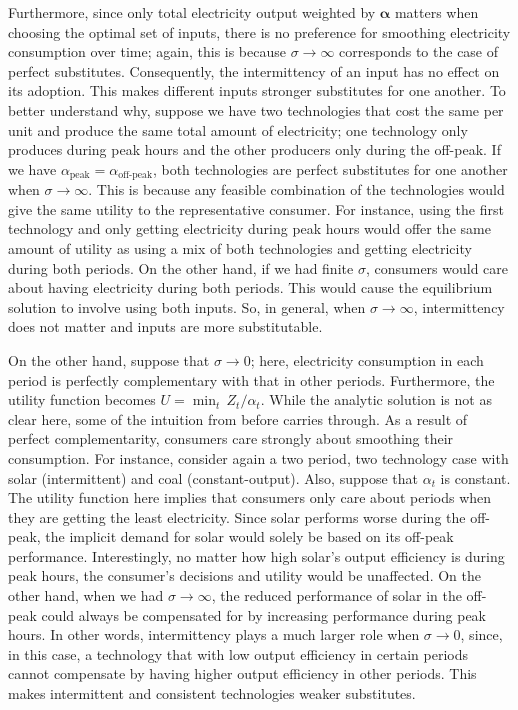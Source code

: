 \documentclass[11pt,a4paper,leqno]{extarticle}
\begin{document}
	Furthermore, since only total electricity output weighted by $\boldsymbol{\alpha}$ matters when choosing the optimal set of inputs, there is no preference for smoothing electricity consumption over time; again, this is because $\sigma \to \infty$ corresponds to the case of perfect substitutes. Consequently, the intermittency of an input has no effect on its adoption. This makes different inputs stronger substitutes for one another. To better understand why, suppose we have two technologies that cost the same per unit and produce the same total amount of electricity; one technology only produces during peak hours and the other producers only during the off-peak. If we have $\alpha_{\text{peak}} = \alpha_{\text{off-peak}}$, both technologies are perfect substitutes for one another when $\sigma \to \infty$. This is because any feasible combination of the technologies would give the same utility to the representative consumer. For instance, using the first technology and only getting electricity during peak hours would offer the same amount of utility as using a mix of both technologies and getting electricity during both periods. On the other hand, if we had finite $\sigma$, consumers would care about having electricity during both periods. This would cause the equilibrium solution to involve using both inputs. So, in general, when $\sigma \to \infty$, intermittency does not matter and inputs are more substitutable. 
	
	On the other hand, suppose that $\sigma \to 0$; here, electricity consumption in each period is perfectly complementary with that in other periods. Furthermore, the utility function becomes $U = \min_t \, Z_t/\alpha_t$. While the analytic solution is not as clear here, some of the intuition from before carries through. As a result of perfect complementarity, consumers care strongly about smoothing their consumption. For instance, consider again a two period, two technology case with solar (intermittent) and coal (constant-output). Also, suppose that $\alpha_t$ is constant. The utility function here implies that consumers only care about periods when they are getting the least electricity. Since solar performs worse during the off-peak, the implicit demand for solar would solely be based on its off-peak performance. Interestingly, no matter how high solar's output efficiency is during peak hours, the consumer's decisions and utility would be unaffected. On the other hand, when we had $\sigma \to \infty$, the reduced performance of solar in the off-peak could always be compensated for by increasing performance during peak hours. In other words, intermittency plays a much larger role when $\sigma \to 0$, since, in this case, a technology that with low output efficiency in certain periods cannot compensate by having higher output efficiency in other periods. This makes intermittent and consistent technologies weaker substitutes. 
	
\end{document}
